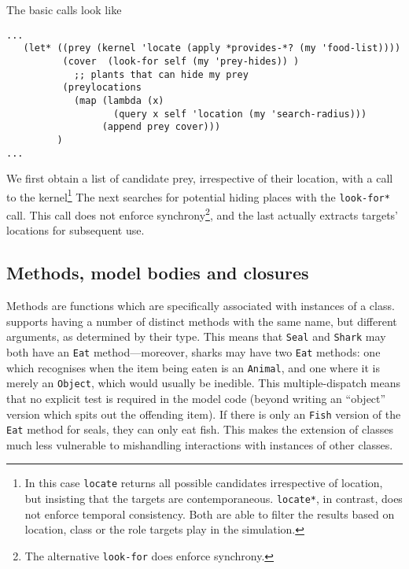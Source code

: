 The basic calls look like
\begin{verbatim}
...
   (let* ((prey (kernel 'locate (apply *provides-*? (my 'food-list))))
          (cover  (look-for self (my 'prey-hides)) )
            ;; plants that can hide my prey
          (preylocations 
            (map (lambda (x) 
                   (query x self 'location (my 'search-radius))) 
                 (append prey cover)))
         )
...
\end{verbatim}
We first obtain a list of candidate prey, irrespective of their
location, with a call to the kernel\footnote{In this case
  \texttt{locate} returns all possible candidates irrespective of
  location, but insisting that the targets are
  contemporaneous. \texttt{locate*}, in contrast, does not enforce
  temporal consistency. Both are able to filter the results based on
  location, class or the role targets play in the simulation.}
The next searches for potential hiding places with the
\texttt{look-for*} call. This call does not enforce synchrony\footnote{The
  alternative \texttt{look-for} does enforce synchrony.}, and the last
actually extracts targets' locations for subsequent use.




\subsection{Methods, model bodies and closures}

Methods are functions which are specifically associated with instances
of a class.  \SCLOS supports having a number of distinct methods with
the same name, but different arguments, as determined by their type.
This means that \texttt{Seal} and \texttt{Shark} may both have an
\texttt{Eat} method---moreover, sharks may have two \texttt{Eat}
methods: one which recognises when the item being eaten is an
\texttt{Animal}, and one where it is merely an \texttt{Object}, which
would usually be inedible.  This multiple-dispatch means that no
explicit test is required in the model code (beyond writing an
``object'' version which spits out the offending item).  If there is
only an \texttt{Fish} version of the \texttt{Eat} method for seals,
they can only eat fish.  This makes the extension of classes much less
vulnerable to mishandling interactions with instances of other
classes.  


